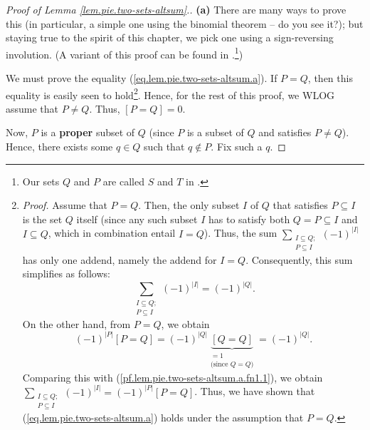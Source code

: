 \begin{proof}
[Proof of Lemma \ref{lem.pie.two-sets-altsum}.]\textbf{(a)} There are many
ways to prove this (in particular, a simple one using the binomial theorem --
do you see it?); but staying true to the spirit of this chapter, we pick one
using a sign-reversing involution. (A variant of this proof can be found in
\cite[solution to Exercise 2.9.1]{19fco}.\footnote{Our sets $Q$ and $P$ are
called $S$ and $T$ in \cite[solution to Exercise 2.9.1]{19fco}.})

We must prove the equality (\ref{eq.lem.pie.two-sets-altsum.a}). If $P=Q$,
then this equality is easily seen to hold\footnote{\textit{Proof.} Assume that
$P=Q$. Then, the only subset $I$ of $Q$ that satisfies $P\subseteq I$ is the
set $Q$ itself (since any such subset $I$ has to satisfy both $Q=P\subseteq I$
and $I\subseteq Q$, which in combination entail $I=Q$). Thus, the sum
$\sum_{\substack{I\subseteq Q;\\P\subseteq I}}\left(  -1\right)  ^{\left\vert
I\right\vert }$ has only one addend, namely the addend for $I=Q$.
Consequently, this sum simplifies as follows:%
\begin{equation}
\sum_{\substack{I\subseteq Q;\\P\subseteq I}}\left(  -1\right)  ^{\left\vert
I\right\vert }=\left(  -1\right)  ^{\left\vert Q\right\vert }.
\label{pf.lem.pie.two-sets-altsum.a.fn1.1}%
\end{equation}
On the other hand, from $P=Q$, we obtain%
\[
\left(  -1\right)  ^{\left\vert P\right\vert }\left[  P=Q\right]  =\left(
-1\right)  ^{\left\vert Q\right\vert }\underbrace{\left[  Q=Q\right]
}_{\substack{=1\\\text{(since }Q=Q\text{)}}}=\left(  -1\right)  ^{\left\vert
Q\right\vert }.
\]
Comparing this with (\ref{pf.lem.pie.two-sets-altsum.a.fn1.1}), we obtain
$\sum_{\substack{I\subseteq Q;\\P\subseteq I}}\left(  -1\right)  ^{\left\vert
I\right\vert }=\left(  -1\right)  ^{\left\vert P\right\vert }\left[
P=Q\right]  $. Thus, we have shown that (\ref{eq.lem.pie.two-sets-altsum.a})
holds under the assumption that $P=Q$.}. Hence, for the rest of this proof, we
WLOG assume that $P\neq Q$. Thus, $\left[  P=Q\right]  =0$.

Now, $P$ is a \textbf{proper} subset of $Q$ (since $P$ is a subset of $Q$ and
satisfies $P\neq Q$). Hence, there exists some $q\in Q$ such that $q\notin P$.
Fix such a $q$.


\end{proof}
